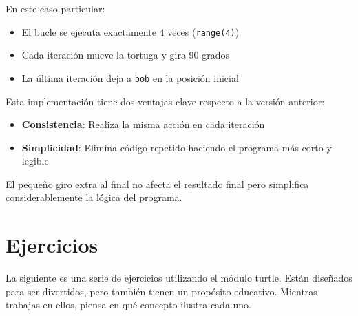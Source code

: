 En este caso particular:
\begin{itemize}
\item El bucle se ejecuta exactamente 4 veces (\texttt{range(4)})
\item Cada iteración mueve la tortuga y gira 90 grados
\item La última iteración deja a \texttt{bob} en la posición inicial
\end{itemize}

Esta implementación tiene dos ventajas clave respecto a la versión anterior:
\begin{itemize}
\item \textbf{Consistencia}: Realiza la misma acción en cada iteración
\item \textbf{Simplicidad}: Elimina código repetido haciendo el programa más corto y legible
\end{itemize}

El pequeño giro extra al final no afecta el resultado final pero simplifica considerablemente la lógica del programa.

\section{Ejercicios}

La siguiente es una serie de ejercicios utilizando el módulo turtle. Están diseñados para ser divertidos, pero también tienen un propósito educativo. Mientras trabajas en ellos, piensa en qué concepto ilustra cada uno.

